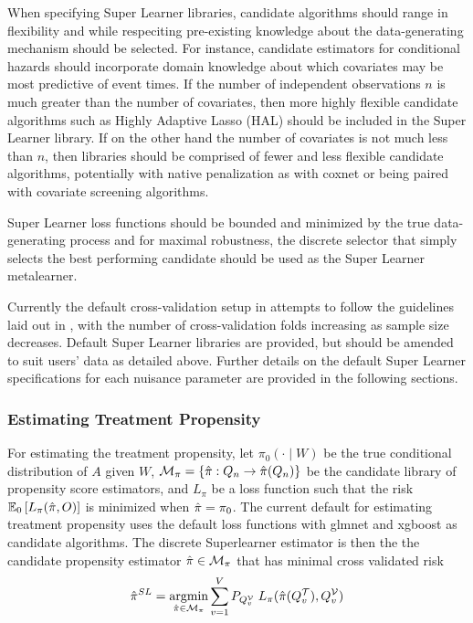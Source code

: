 \documentclass{report}
\DeclareMathOperator*{\argmin}{argmin}
\newcommand{\1}{\ensuremath{\mathbf{1}}}
\newcommand{\X}{\ensuremath{{W}}}
\newcommand{\g}{\ensuremath{\pi}}
\begin{document}
When specifying Super Learner libraries, candidate algorithms should range in flexibility and while respeciting pre-existing knowledge about the data-generating mechanism should be selected. For instance, candidate estimators for conditional hazards should incorporate domain knowledge about which covariates may be most predictive of event times. If the number of independent observations \(n\) is much greater than the number of covariates, then more highly flexible candidate algorithms such as Highly Adaptive Lasso (HAL) should be included in the Super Learner library. If on the other hand the number of covariates is not much less than \(n\), then libraries should be comprised of fewer and less flexible candidate algorithms,  potentially with native penalization as with coxnet or being paired with covariate screening algorithms.

Super Learner loss functions should be bounded and minimized by the true data-generating process and for maximal robustness, the discrete selector that simply selects the best performing candidate should be used as the Super Learner metalearner.

Currently the default cross-validation setup in  attempts to follow the guidelines laid out in \cite{phillips_practical_2022}, with the number of cross-validation folds increasing as sample size decreases. Default Super Learner libraries are provided, but should be amended to suit users' data as detailed above. Further details on the default  Super Learner specifications for each nuisance parameter are provided in the following sections.

\subsubsection{Estimating Treatment Propensity}
\label{trtps-est}
For estimating the treatment propensity, let \(\g_0(\cdot \mid \X)\) be the true conditional distribution of \(A\) given \(\X\), \(\mathcal{M}_{\g} = \left\{\Hat{\g} : Q_n \to \Hat{\g}(Q_n) \right\}\) be the candidate library of propensity score estimators, and \(L_\g\) be a loss function such that the risk \(\mathbb{E}_0\left[L_\g(\Hat{\g}, O)\right]\) is minimized when \(\Hat{\g} = \g_0\). The current  default for estimating treatment propensity uses the default  loss functions with glmnet and xgboost as candidate algorithms. The discrete Superlearner estimator is then the the candidate propensity estimator \(\Hat{\g} \in \mathcal{M}_{\g}\) that has minimal cross validated risk
\begin{equation}
\Hat{\g}^{SL} = \argmin_{\Hat{\g} \in \mathcal{M}_\g} \sum_{v = 1}^{V} P_{Q^\mathcal{V}_v} \; L_\g(\Hat{\g}(Q^\mathcal{T}_v), Q^\mathcal{V}_v) \label{propsl}
\end{equation}
\end{document}
